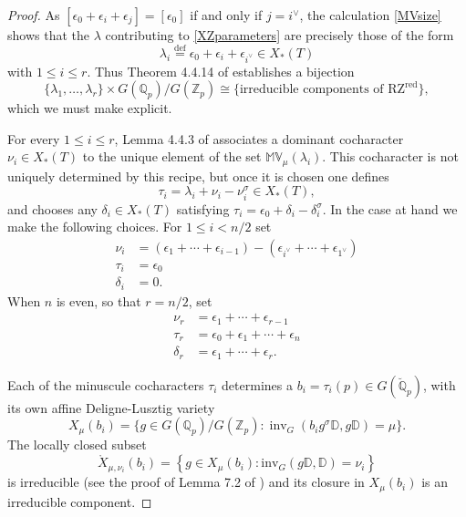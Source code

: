 \documentclass[11pt]{alggeom}
\newcommand{\iso}{\cong}
\newcommand{\define}{\stackrel{\mathrm{def}}{=}}
\newcommand{\red}{\mathrm{red}}
\newcommand{\Q}{\mathbb Q}
\newcommand{\Z}{\mathbb Z}
\DeclareMathOperator{\inv}{inv}
\begin{document}
\begin{proof}
As $[ \epsilon_0+\epsilon_i+\epsilon_j]  = [\epsilon_0]$ if and only if $j=i^\vee$,
  the calculation \eqref{MVsize} shows that the  $\lambda$  contributing to \eqref{XZparameters} are precisely those of the form
  \[
\lambda _i \define \epsilon_0 + \epsilon_i + \epsilon_{i^\vee} \in X_*(T)
\]
with $1\le i \le r$.
  Thus  Theorem 4.4.14 of \cite{XZ} establishes  a bijection 
 \begin{equation}\label{XZsimple}
 \{ \lambda_1,\ldots, \lambda_r\}  \times G(\Q_p)/G(\Z_p) \iso \{\mbox{irreducible components of }\mathrm{RZ}^\red \},
\end{equation}
which we must make explicit.


 For every $1\le i \le r$,  Lemma 4.4.3 of \cite{XZ} associates a dominant cocharacter $\nu_i\in X_*(T)$ to the unique element of  the set $\mathbb{MV}_\mu(\lambda_i)$.
This  cocharacter   is not uniquely determined by this recipe, but once it is chosen one defines
\[
\tau_i = \lambda_i+ \nu_i -  \nu_i^\sigma \in X_*(T),
\]
and chooses  any $\delta_i \in X_*(T)$  satisfying $\tau_i = \epsilon_0 + \delta_i -  \delta_i^\sigma$.
In the case at hand we make the following choices.
For $1\le i < n/2$ set 
\begin{align*}
\nu_i  & =  (\epsilon_1+ \cdots +\epsilon_{i-1}) - (\epsilon_{i^\vee}+ \cdots +\epsilon_{1^\vee}) \\
  \tau_i & =\epsilon_0  \\
  \delta_i &= 0.
\end{align*}
When $n$ is even, so that $r=n/2$,  set
\begin{align*}
\nu_r  & =  \epsilon_1+ \cdots +\epsilon_{r-1} \\
  \tau_r & = \epsilon_0+\epsilon_1+\cdots+\epsilon_n \\
  \delta_r &=   \epsilon_1+ \cdots +\epsilon_r.
\end{align*}





Each of the minuscule cocharacters $\tau_i$ determines a  $b_i=\tau_i(p) \in G(\breve{\Q}_p)$, 
with its own affine Deligne-Lusztig variety
\[
X_\mu(b_i)  = \{ g \in G(\Q_p)/G(\Z_p) :  \inv_G( b_i g^\sigma \mathbb{D} , g \mathbb{D}) = \mu  \} .
\]
The locally closed subset
\[
\mathring{X}_{\mu,\nu_i}(b_i)  = \left\{ g\in X_\mu(b_i)  :  \mathrm{inv}_G( g \mathbb{D} , \mathbb{D} ) = \nu_i  \right\} 
\]
is  irreducible (see the proof of Lemma 7.2 of \cite{FI})  and its closure in $ X_\mu(b_i)$ is an irreducible component.



\end{proof}
\end{document}
